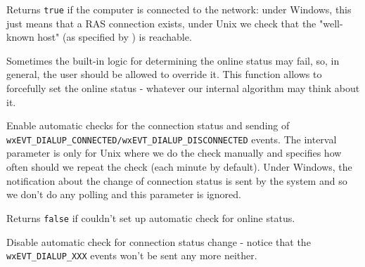 \label{wxdialupmanagerisonline}


Returns {\tt true} if the computer is connected to the network: under Windows,
this just means that a RAS connection exists, under Unix we check that
the "well-known host" (as specified by 
) is reachable.

\label{wxdialupmanagersetonlinestatus}


Sometimes the built-in logic for determining the online status may fail,
so, in general, the user should be allowed to override it. This function
allows to forcefully set the online status - whatever our internal
algorithm may think about it.



\label{wxdialupmanagerenableautocheckonlinestatus}


Enable automatic checks for the connection status and sending of 
{\tt wxEVT\_DIALUP\_CONNECTED/wxEVT\_DIALUP\_DISCONNECTED} events. The interval
parameter is only for Unix where we do the check manually and specifies how
often should we repeat the check (each minute by default). Under Windows, the
notification about the change of connection status is sent by the system and so
we don't do any polling and this parameter is ignored.

Returns {\tt false} if couldn't set up automatic check for online status.

\label{wxdialupmanagerdisableautocheckonlinestatus}


Disable automatic check for connection status change - notice that the
{\tt wxEVT\_DIALUP\_XXX} events won't be sent any more neither.

\label{wxdialupmanagersetwellknownhost}


